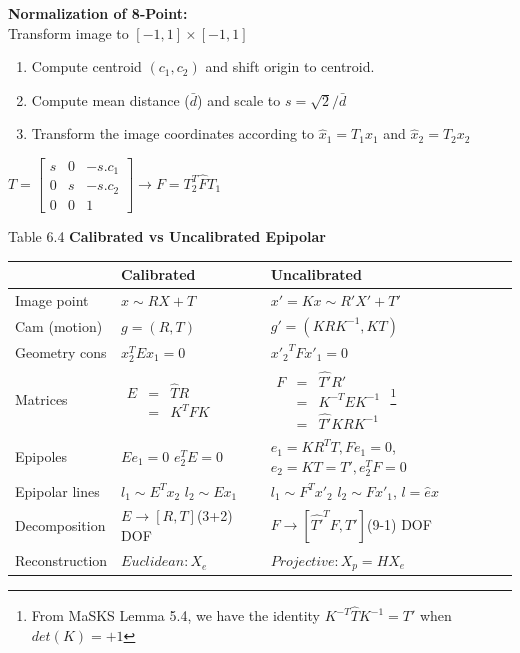 \documentclass{../cheat}
\begin{document}
\begin{multicols}{3}
	\textbf{Normalization of 8-Point:}\\ Transform image to $[-1,1]\times[-1,1]$
	\begin{enumerate}
		\item Compute centroid $(c_1, c_2)$ and shift origin to centroid.
		\item Compute mean distance ($\bar{d}$) and scale to $s= \sqrt{2}/\bar{d}$
		\item Transform the image coordinates according to $\hat{x}_1=T_1 x_1$ and $\hat{x}_2=T_2 x_2$
	\end{enumerate}
	\centerline{$T=\begin{bmatrix}s & 0 & -s.c_1\\0 & s & -s.c_2\\0 & 0 & 1\end{bmatrix}\rightarrow F = T_2^T \hat{F} T_1$}
	
	Table 6.4
	\textbf{Calibrated vs Uncalibrated Epipolar}\\
	\begin{tabularx}{\columnwidth}{| @{ }p{55pt} | p{60pt} | X |}
	\hline
	& \textbf{Calibrated} & \textbf{Uncalibrated} \\ \hline \hline
	Image point & $x \sim R X+T$ & $x'=Kx \sim R'X'+T'$ \\ \hline
	Cam (motion) & $g=(R,T)$ & $g'=(KRK^{-1}, KT)$ \\ \hline
	Geometry cons & $x_2^T E x_1=0$ & ${x'_2}^T F x'_1=0$ \\ \hline
	Matrices & $\begin{array}{lll}
		E &=&\widehat{T}R\\
   		   &=&K^T FK
		\end{array} $ &
		$\begin{array}{lll}
		 F&=&\widehat{T'}R'\\
		  &=&K^{-T}E K^{-1}\\
		  &=&\widehat{T'}KRK^{-1}
		\end{array}$
		\footnote{From MaSKS Lemma 5.4, we have the identity $K^{-T} \widehat{T}K^{-1}=\widehat{T'}$ when $det(K) = +1$} \\ \hline
	Epipoles & $Ee_1=0$ \newline $e_2^T E=0$ & $e_1=KR^T T, Fe_1=0$,\newline $e_2=KT=T', e_2^T F=0$ \\ \hline
	Epipolar lines & $l_1\sim E^T x_2$ \newline $l_2\sim E x_1$ & $l_1\sim F^T x'_2$ \newline $l_2\sim F x'_1$,
	 $l=\widehat{e}x$ \\ \hline
	Decomposition & $E \rightarrow [R, T]$\newline 5(3+2) DOF & $F \rightarrow [\widehat{T'}^TF, T']$\newline 8(9-1) DOF \\ \hline
	Reconstruction & $Euclidean: X_e$ & $Projective: X_p=H X_e$ \\ \hline
	\end{tabularx}


\end{multicols}
\end{document}
